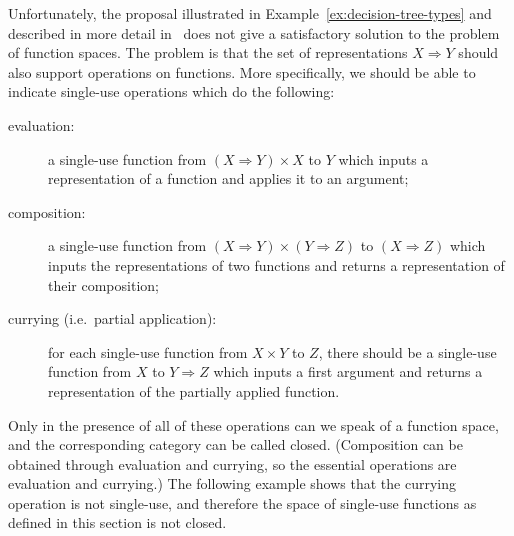 \documentclass[a4paper,UKenglish,cleveref, autoref, numberwithinsect, thm-restate]{lipics-v2021}
\begin{document}
Unfortunately, the proposal illustrated in Example~\ref{ex:decision-tree-types} and described in more detail in~\cite{stefanski-phd}  does not give a satisfactory solution to the problem of function spaces. The problem is that the set of representations $X \Rightarrow Y$ should  also support operations on functions. More specifically, we should be able to indicate single-use operations which do the following:
\begin{description}
    \item[evaluation:] a single-use function from $(X \Rightarrow Y) \times X$ to $Y$ which inputs a representation of a function and applies it to an argument;
    \item[composition:] a single-use function from $(X \Rightarrow Y) \times (Y \Rightarrow Z)$ to $(X \Rightarrow Z)$ which inputs the representations of two functions and returns a representation of their composition;
    \item[currying (i.e.\ partial application):] for each single-use function from  $ X \times Y $ to $Z$, there should be a single-use function from $X$ to $Y \Rightarrow Z$ which inputs a first argument and returns a representation of the  partially applied function.
\end{description}
Only in the presence of all of these operations can we speak of a function space, and the corresponding category can be called closed. (Composition can be obtained through evaluation and currying, so the essential operations are evaluation and currying.) The following example shows that the currying operation is not single-use, and therefore the space of single-use functions as defined in this section is not closed.
\end{document}
